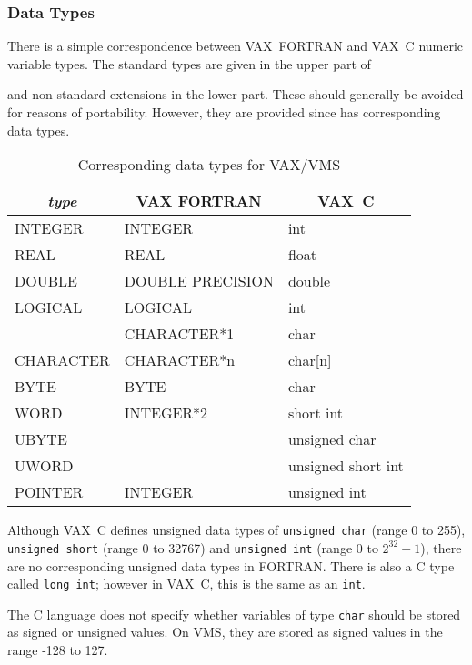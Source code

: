 \documentclass[twoside,11pt,nolof]{starlink}
\begin{document}
\subsubsection{Data Types}

There is a simple correspondence between VAX~FORTRAN and VAX~C numeric variable
types. The standard types are given in the upper part of


 and non-standard extensions in the lower
part.
These should generally be avoided for reasons of portability. However, they are
provided since
 
has corresponding data types.

\begin{table}[htb]
\begin{center}
\begin{tabular}{|l|l|l|} \hline
\multicolumn{1}{|c|}{\textit{type}} & \multicolumn{1}{|c|}{VAX FORTRAN} &
\multicolumn{1}{c|}{VAX~C} \\ \hline
INTEGER & INTEGER & int \\
REAL & REAL & float \\
DOUBLE & DOUBLE PRECISION & double \\
LOGICAL & LOGICAL & int \\
& CHARACTER*1 & char \\
CHARACTER & CHARACTER*n & char[n] \\ \hline
BYTE & BYTE & char \\
WORD & INTEGER*2 & short int\\
UBYTE & & unsigned char\\
UWORD & & unsigned short int\\ \hline
POINTER & INTEGER & unsigned int\\ \hline
\end{tabular}
\end{center}
\caption{Corresponding data types for VAX/VMS}
\label{vms_datatypes}
\end{table}

Although VAX~C defines unsigned data types of \texttt{unsigned char} (range 0
to 255),  \texttt{unsigned short} (range 0 to 32767) and \texttt{unsigned int}
(range 0 to $2^{32}-1$), there are no corresponding unsigned data types in
FORTRAN\@.
There is also a C type called \texttt{long int}; however in VAX~C, this is the
same as an \texttt{int}.

The C language does not specify whether variables of type \texttt{char} should be
stored as signed or unsigned values. On VMS, they are stored as signed
values in the range -128 to 127.
\end{document}
